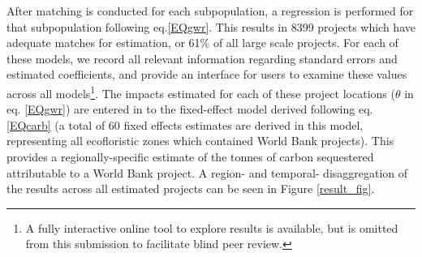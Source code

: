 \documentclass{article}\usepackage[]{graphicx}\usepackage[]{color}
\newenvironment{knitrout}{}{}  %
\begin{document}
\begin{knitrout}
After matching is conducted for each subpopulation, a regression is performed for that subpopulation following eq.\ref{EQgwr}.  
This results in 8399 projects which have adequate matches for estimation, or 61\% of all large scale projects. 
For each of these models, we record all relevant information regarding standard errors and estimated coefficients, and provide an interface for users to examine these values across all models\footnote{A fully interactive online tool to explore results is available, but is omitted from this submission to facilitate blind peer review.}.  
The impacts estimated for each of these project locations (\begin{math}\theta\end{math} in eq. \ref{EQgwr}) are entered in to the fixed-effect model derived following eq. \ref{EQcarb} (a total of 60 fixed effects estimates are derived in this model, representing all ecofloristic zones which contained World Bank projects).
This provides a regionally-specific estimate of the tonnes of carbon sequestered attributable to a World Bank project.
A region- and temporal- disaggregation of the results across all estimated projects can be seen in Figure \ref{result_fig}.

\newpage

\end{knitrout}
\end{document}
